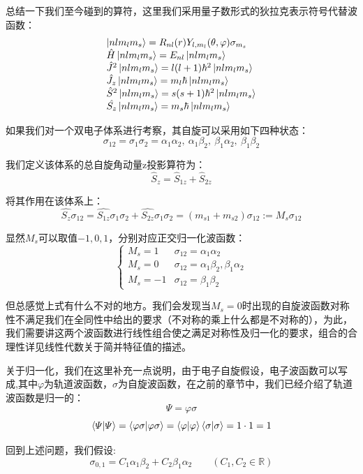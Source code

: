 总结一下我们至今碰到的算符，这里我们采用量子数形式的狄拉克表示符号代替波函数：
\[
    \begin{array}{ll}
        \ket{nlm_lm_s}=R_{nl}(r)Y_{l,m_l}(\theta,\varphi)\sigma_{m_s} \\
        \hat{H}\ket{nlm_lm_s}=E_{nl}\ket{nlm_lm_s} \\
        \hat{J}^2\ket{nlm_lm_s}=l(l+1)\hbar^2\ket{nlm_lm_s} \\
        \hat{J_z}\ket{nlm_lm_s}=m_l\hbar\ket{nlm_lm_s} \\
        \hat{S}^2\ket{nlm_lm_s}=s(s+1)\hbar^2\ket{nlm_lm_s} \\
        \hat{S_z}\ket{nlm_lm_s}=m_s\hbar\ket{nlm_lm_s}
    \end{array}
\]

如果我们对一个双电子体系进行考察，其自旋可以采用如下四种状态：
\[\sigma_{12}=\sigma_{1}\sigma_{2}=\alpha_1\alpha_2, \ \alpha_1\beta_2, \ \beta_1\alpha_2, \ \beta_1\beta_2\]

我们定义该体系的总自旋角动量z投影算符为：
\[\hat{S}_z=\hat{S}_{1z}+\hat{S}_{2z}\]

将其作用在该体系上：
\[\hat{S_z}\sigma_{12}=\hat{S_{1z}}\sigma_{1}\sigma_{2}+\hat{S_{2z}}\sigma_{1}\sigma_{2}=(m_{s1}+m_{s2})\sigma_{12}:=M_s\sigma_{12}\]

显然$M_s$可以取值$-1,0,1$，分别对应正交归一化波函数：
\[
    \left \{
    \begin{array}{ll}
        M_s=1  & \sigma_{12}=\alpha_1\alpha_2\\
        M_s=0  & \sigma_{12}=\alpha_1\beta_2,\beta_1\alpha_2\\
        M_s=-1 & \sigma_{12}=\beta_1\beta_2
    \end{array}
    \right .
\]

但总感觉上式有什么不对的地方。我们会发现当$M_s=0$时出现的自旋波函数对称性不满足我们在全同性中给出的要求（不对称的乘上什么都是不对称的），为此，我们需要讲这两个波函数进行线性组合使之满足对称性及归一化的要求，组合的合理性详见线性代数关于简并特征值的描述。

关于归一化，我们在这里补充一点说明，由于电子自旋假设，电子波函数可以写成,其中$\varphi$为轨道波函数，$\sigma$为自旋波函数，在之前的章节中，我们已经介绍了轨道波函数是归一的：
\[\varPsi=\varphi\sigma\]
\[\bra{\varPsi}\ket{\varPsi}=\bra{\varphi\sigma}\ket{\varphi\sigma}=\bra{\varphi}\ket{\varphi}\bra{\sigma}\ket{\sigma}=1 \cdot 1=1\]

回到上述问题，我们假设:
\[\sigma_{0,1}=C_1\alpha_1\beta_2+C_2\beta_1\alpha_2 \qquad (C_1,C_2 \in \mathbb{R})\]

